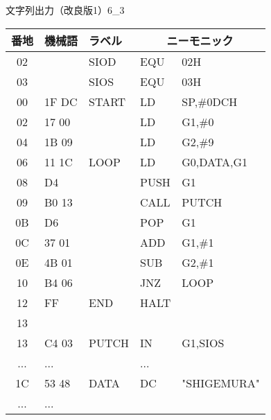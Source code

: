 \begin{figure}[btp]
\begin{reidai}{文字列出力（改良版1）}{6_3}
\begin{description}
{\tt\footnotesize\begin{center}
\begin{tabular}{|c|l|l|l l|} \hline
番地 & 機械語 & ラベル & \multicolumn{2}{|c|}{ニーモニック} \\
\hline
02 &       & SIOD  & EQU  & 02H             \\
03 &       & SIOS  & EQU  & 03H             \\
00 & 1F DC & START & LD   & SP,\#0DCH       \\
02 & 17 00 &       & LD   & G1,\#0          \\
04 & 1B 09 &       & LD   & G2,\#9          \\
06 & 11 1C & LOOP  & LD   & G0,DATA,G1      \\
08 & D4    &       & PUSH & G1              \\
09 & B0 13 &       & CALL & PUTCH           \\
0B & D6    &       & POP  & G1              \\
0C & 37 01 &       & ADD  & G1,\#1          \\
0E & 4B 01 &       & SUB  & G2,\#1          \\
10 & B4 06 &       & JNZ  & LOOP            \\
12 & FF    & END   & HALT &                 \\
13 &       &       &      &                 \\
13 & C4 03 & PUTCH & IN   & G1,SIOS         \\
...& ...   &       & ...  &                 \\
1C & 53 48 & DATA  & DC   & "SHIGEMURA"     \\
...& ...   &       &      &                 \\
\hline
\end{tabular}
\end{center}}
\end{description}
\end{reidai}
\end{figure}

